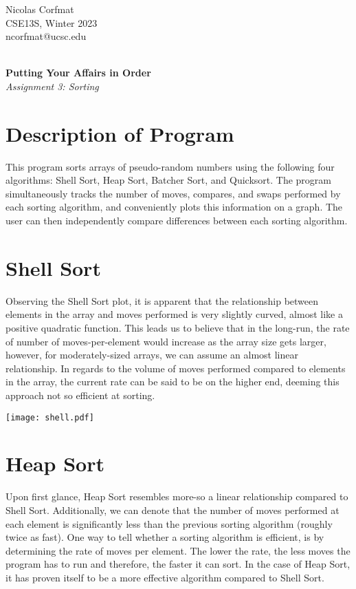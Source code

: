 \documentclass[12pt]{article}
\begin{document}
\flushright
Nicolas Corfmat \\CSE13S, Winter 2023 \\ ncorfmat@ucsc.edu

\flushleft
\LARGE
\textbf{\\Putting Your Affairs in Order}
\large
\\\textit{Assignment 3: Sorting}

\section{Description of Program}
\normalsize
This program sorts arrays of pseudo-random numbers using the following four algorithms: Shell Sort, Heap Sort, Batcher Sort, and Quicksort. The program simultaneously tracks the number of moves, compares, and swaps performed by each sorting algorithm, and conveniently plots this information on a graph. The user can then independently compare differences between each sorting algorithm.

\section{Shell Sort}

Observing the Shell Sort plot, it is apparent that the relationship between elements in the array and moves performed is very slightly curved, almost like a positive quadratic function. This leads us to believe that in the long-run, the rate of number of moves-per-element would increase as the array size gets larger, however, for moderately-sized arrays, we can assume an almost linear relationship. In regards to the volume of moves performed compared to elements in the array, the current rate can be said to be on the higher end, deeming this approach not so efficient at sorting.

\texttt{[image: shell.pdf]}

\section{Heap Sort}

Upon first glance, Heap Sort resembles more-so a linear relationship compared to Shell Sort. Additionally, we can denote that the number of moves performed at each element is significantly less than the previous sorting algorithm (roughly twice as fast). One way to tell whether a sorting algorithm is efficient, is by determining the rate of moves per element. The lower the rate, the less moves the program has to run and therefore, the faster it can sort. In the case of Heap Sort, it has proven itself to be a more effective algorithm compared to Shell Sort.
\end{document}
